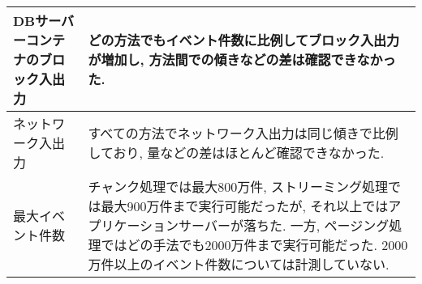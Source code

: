 \documentclass[../../../main]{subfiles}
\begin{document}
\begin{table}[H]
\begin{tabular}{|p{4cm}|p{10cm}|}
            DBサーバーコンテナのブロック入出力       & どの方法でもイベント件数に比例してブロック入出力が増加し, 方法間での傾きなどの差は確認できなかった.                                                                                                                                                                                      \\ \hline
            ネットワーク入出力                & すべての方法でネットワーク入出力は同じ傾きで比例しており, 量などの差はほとんど確認できなかった.                                                                                                                                                                                    \\ \hline
            最大イベント件数                  & チャンク処理では最大800万件, ストリーミング処理では最大900万件まで実行可能だったが, それ以上ではアプリケーションサーバーが落ちた. 一方, ページング処理ではどの手法でも2000万件まで実行可能だった. 2000万件以上のイベント件数については計測していない.                                                     \\ \hline
        \end{tabular}
    \end{table}
\end{document}
